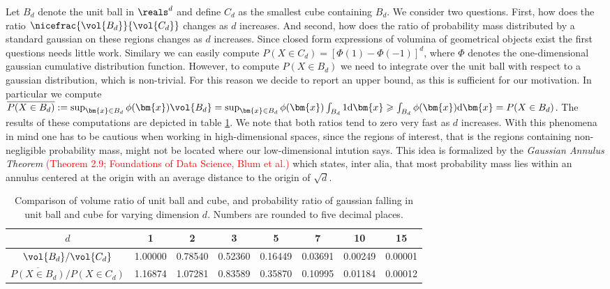 Let $B_d$ denote the unit ball in $\reals^d$ and define $C_d$ as the smallest cube containing $B_d$.
We consider two questions.
First, how does the ratio $\nicefrac{\vol{B_d}}{\vol{C_d}}$ changes as $d$ increases.
And second, how does the ratio of probability mass distributed by a standard gaussian on these regions changes as $d$ increases.
Since closed form expressions of volumina of geometrical objects exist the first questions needs little work.
Similary we can easily compute $P(X \in C_d) = \left[\Phi(1) - \Phi(-1)\right]^d$, where $\Phi$ denotes the one-dimensional gaussian cumulative distribution function.
However, to compute $P(X \in B_d)$ we need to integrate over the unit ball with respect to a gaussian distribution, which is non-trivial.
For this reason we decide to report an upper bound, as this is sufficient for our motivation.
In particular we compute $\overline{P(X \in B_d)} := \sup_{\bm{x} \in B_d} \phi(\bm{x}) \vol{B_d} = \sup_{\bm{x} \in B_d} \phi(\bm{x}) \int_{B_d}1 \mathrm{d}\bm{x} \geqslant \int_{B_d} \phi(\bm{x}) \mathrm{d}\bm{x} = P(X \in B_d)$.
The results of these computations are depicted in table \ref{tab:vol_high_dim}.
We note that both ratios tend to zero very fast as $d$ increases.
With this phenomena in mind one has to be cautious when working in high-dimensional spaces, since the regions of interest, that is the regions containing non-negligible probability mass, might not be located where our low-dimensional intution says.
This idea is formalized by the \emph{Gaussian Annulus Theorem} \textcolor{red}{(Theorem 2.9; Foundations of Data Science, Blum et al.)} which states, inter alia, that most probability mass lies within an annulus centered at the origin with an average distance to the origin of $\sqrt{d}$.


\begin{table}[ht]
\def\arraystretch{1.3}
\centering
 \begin{tabular}{c | c c c c c c c}
 $d$ & 1 & 2 & 3 & 5 & 7 & 10 & 15\\
 \hline
 ${\vol{B_d}} / {\vol{C_d}}$ & 1.00000 & 0.78540 & 0.52360 & 0.16449 & 0.03691 & 0.00249 & 0.00001\\
 ${\overline{P(X \in B_d)}} / {P(X \in C_d)}$ & 1.16874 & 1.07281 & 0.83589 & 0.35870 & 0.10995 & 0.01184 & 0.00012
 \end{tabular}
 \caption{Comparison of volume ratio of unit ball and cube, and probability ratio of gaussian falling in unit ball and cube for varying dimension $d$. Numbers are rounded to five decimal places.}
\label{tab:vol_high_dim}
\end{table}



